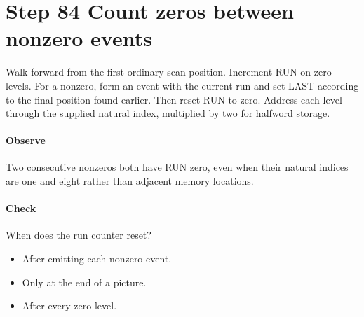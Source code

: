 \section{Step 84 Count zeros between nonzero events}\label{h263-coeff-s04}
Walk forward from the first ordinary scan position. Increment RUN on zero levels.
For a nonzero, form an event with the current run and set LAST according to the
final position found earlier. Then reset RUN to zero. Address each level through
the supplied natural index, multiplied by two for halfword storage.

\paragraph{Observe} Two consecutive nonzeros both have RUN zero, even when their
natural indices are one and eight rather than adjacent memory locations.
\paragraph{Check} When does the run counter reset?
\begin{itemize}
  \item[A.] After emitting each nonzero event.
  \item[B.] Only at the end of a picture.
  \item[C.] After every zero level.
\end{itemize}
